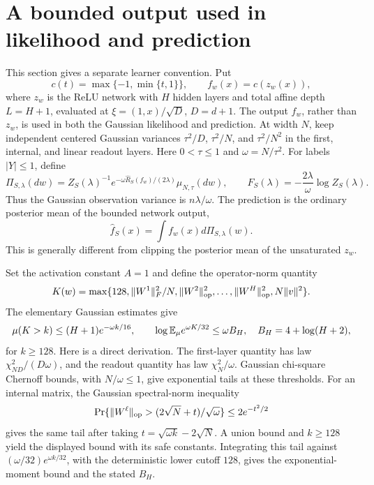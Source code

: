 \section{A bounded output used in likelihood and prediction}
\label{sec:saturated-specialization}
This section gives a separate learner convention. Put
\[
 c(t)=\max\{-1,\min\{t,1\}\},\qquad f_w(x)=c(z_w(x)),
\]
where $z_w$ is the ReLU network with $H$ hidden layers and total affine depth $L=H+1$, evaluated at $\xi=(1,x)/\sqrt D$, $D=d+1$. The output $f_w$, rather than $z_w$, is used in both the Gaussian likelihood and prediction. At width $N$, keep independent centered Gaussian variances $\tau^2/D$, $\tau^2/N$, and $\tau^2/N^2$ in the first, internal, and linear readout layers. Here $0<\tau\le1$ and $\omega=N/\tau^2$. For labels $|Y|\le1$, define
\[
 \Pi_{S,\lambda}(dw)=Z_S(\lambda)^{-1}
 e^{-\omega\widehat R_S(f_w)/(2\lambda)}\mu_{N,\tau}(dw),
 \qquad
 F_S(\lambda)=-\frac{2\lambda}{\omega}\log Z_S(\lambda).
\]
Thus the Gaussian observation variance is $n\lambda/\omega$. The prediction is the ordinary posterior mean of the bounded network output,
\[
 \widehat f_S(x)=\int f_w(x)d\Pi_{S,\lambda}(w).
\]
This is generally different from clipping the posterior mean of the unsaturated $z_w$.

Set the activation constant $A=1$ and define the operator-norm quantity
\[
 K(w)=\max\{128,\|W^1\|_F^2/N,\|W^2\|_{\rm op}^2,\ldots,
                 \|W^H\|_{\rm op}^2,N\|v\|^2\}.
\]
The elementary Gaussian estimates give
\[
 \mu(K>k)\le(H+1)e^{-\omega k/16},\qquad
 \log\mathbb E_\mu e^{\omega K/32}\le\omega B_H,
 \quad B_H=4+\log(H+2),
\]
for $k\ge128$. Here is a direct derivation. The first-layer quantity has law $\chi^2_{ND}/(D\omega)$, and the readout quantity has law $\chi^2_N/\omega$. Gaussian chi-square Chernoff bounds, with $N/\omega\le1$, give exponential tails at these thresholds. For an internal matrix, the Gaussian spectral-norm inequality
\[
 \Pr\{\|W^\ell\|_{\rm op}>(2\sqrt N+t)/\sqrt\omega\}
 \le2e^{-t^2/2}
\]
gives the same tail after taking $t=\sqrt{\omega k}-2\sqrt N$. A union bound and $k\ge128$ yield the displayed bound with its safe constants. Integrating this tail against $(\omega/32)e^{\omega k/32}$, with the deterministic lower cutoff $128$, gives the exponential-moment bound and the stated $B_H$.

